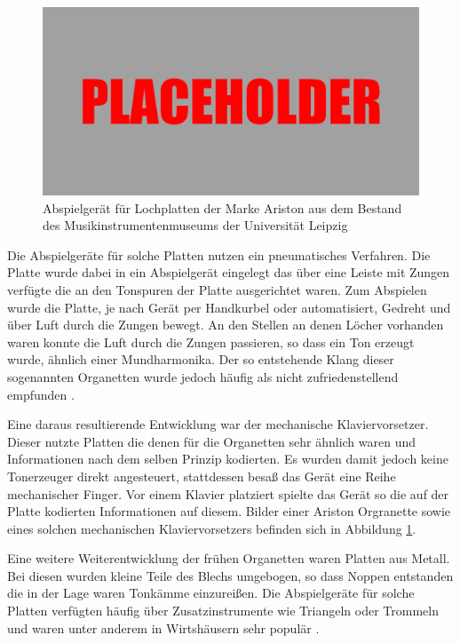 \begin{figure}[t]
    \centering
    \includegraphics[width=\textwidth]{graphics/placeholder.png}
    \caption{Abspielgerät für Lochplatten der Marke Ariston aus dem Bestand des Musikinstrumentenmuseums der Universität Leipzig}
    \label{aristonplayer}
\end{figure}

Die Abspielgeräte für solche Platten nutzen ein pneumatisches Verfahren.
Die Platte wurde dabei in ein Abspielgerät eingelegt das über eine Leiste mit Zungen verfügte die an den Tonspuren der Platte ausgerichtet waren.
Zum Abspielen wurde die Platte, je nach Gerät per Handkurbel oder automatisiert, Gedreht und über Luft durch die Zungen bewegt.
An den Stellen an denen Löcher vorhanden waren konnte die Luft durch die Zungen passieren, so dass ein Ton erzeugt wurde, ähnlich einer Mundharmonika.
Der so entstehende Klang dieser sogenannten Organetten wurde jedoch häufig als nicht zufriedenstellend empfunden \parencite[]{mgg_mechanische}.

Eine daraus resultierende Entwicklung war der mechanische Klaviervorsetzer.
Dieser nutzte Platten die denen für die Organetten sehr ähnlich waren und Informationen nach dem selben Prinzip kodierten.
Es wurden damit jedoch keine Tonerzeuger direkt angesteuert, stattdessen besaß das Gerät eine Reihe mechanischer Finger.
Vor einem Klavier platziert spielte das Gerät so die auf der Platte kodierten Informationen auf diesem.
Bilder einer Ariston Orgranette sowie eines solchen mechanischen Klaviervorsetzers befinden sich in Abbildung \ref{aristonplayer}.

Eine weitere Weiterentwicklung der frühen Organetten waren Platten aus Metall.
Bei diesen wurden kleine Teile des Blechs umgebogen, so dass Noppen entstanden die in der Lage waren Tonkämme einzureißen.
Die Abspielgeräte für solche Platten verfügten häufig über Zusatzinstrumente wie Triangeln oder Trommeln und waren unter anderem in Wirtshäusern sehr populär \parencite[]{mgg_mechanische}.

